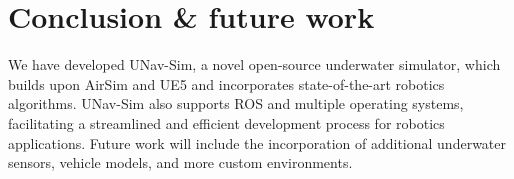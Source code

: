 \section{Conclusion \& future work} \label{sec:conclusion}
We have developed UNav-Sim, a novel open-source underwater simulator, which builds upon AirSim and \ac{UE5} and incorporates state-of-the-art robotics algorithms. UNav-Sim also supports \ac{ROS} and multiple operating systems, facilitating a streamlined and efficient development process for robotics applications. Future work will include the incorporation of additional underwater sensors, vehicle models, and more custom environments. 
